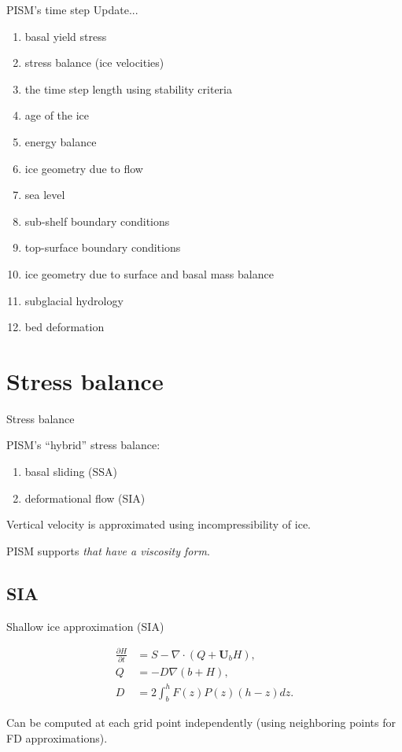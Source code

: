 \documentclass[hide notes,intlimits]{beamer}
\begin{document}
\begin{frame}{PISM's time step}
  Update...
  \begin{enumerate}
  \item basal yield stress
  \item stress balance (ice velocities)
  \item the time step length using stability criteria
  \item age of the ice
  \item energy balance
  \item ice geometry due to flow
  \item sea level
  \item sub-shelf boundary conditions
  \item top-surface boundary conditions
  \item ice geometry due to surface and basal mass balance
  \item subglacial hydrology
  \item bed deformation
  \end{enumerate}
\end{frame}

\section{Stress balance}
\label{sec:stress-balance}

\begin{frame}{Stress balance}

  PISM's ``hybrid'' stress balance:
  \begin{enumerate}
  \item basal sliding (SSA)
  \item deformational flow (SIA)
  \end{enumerate}

  Vertical velocity is approximated using incompressibility of ice.

  PISM supports \emph{that have a viscosity form}.

\end{frame}


\subsection{SIA}
\label{sec:sia}

\begin{frame}{Shallow ice approximation (SIA)}

  \begin{align}
    \label{eq:2}
    \frac{\partial H}{\partial t} &= S - \nabla \cdot (Q + \mathbf{U}_b H),\\
    Q &= -D \nabla (b + H),\\
    D &= 2\int_b^h F(z)P(z)(h-z)dz.
  \end{align}

  Can be computed at each grid point independently (using neighboring
  points for FD approximations).

\end{frame}
\end{document}
